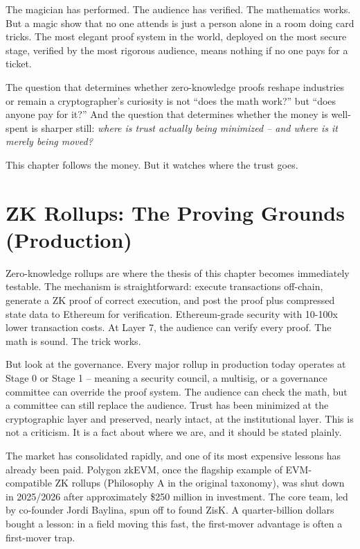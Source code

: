 \documentclass[
  11pt,
  openany]{report}
\begin{document}
The magician has performed. The audience has verified. The mathematics works.
But a magic show that no one attends is just a person alone in a room doing card
tricks. The most elegant proof system in the world, deployed on the most secure
stage, verified by the most rigorous audience, means nothing if no one pays for
a ticket.

The question that determines whether zero-knowledge proofs reshape industries or
remain a cryptographer's curiosity is not ``does the math work?'' but ``does
anyone pay for it?'' And the question that determines whether the money is
well-spent is sharper still: \emph{where is trust actually being minimized --
and where is it merely being moved?}

This chapter follows the money. But it watches where the trust goes.

\section{ZK Rollups: The Proving Grounds
(Production)}\label{zk-rollups-the-proving-grounds-production}

Zero-knowledge rollups are where the thesis of this chapter becomes immediately
testable. The mechanism is straightforward: execute transactions off-chain,
generate a ZK proof of correct execution, and post the proof plus compressed
state data to Ethereum for verification. Ethereum-grade security with 10-100x
lower transaction costs. At Layer 7, the audience can verify every proof. The
math is sound. The trick works.

But look at the governance. Every major rollup in production today operates at
Stage 0 or Stage 1 -- meaning a security council, a multisig, or a governance
committee can override the proof system. The audience can check the math, but a
committee can still replace the audience. Trust has been minimized at the
cryptographic layer and preserved, nearly intact, at the institutional layer.
This is not a criticism. It is a fact about where we are, and it should be
stated plainly.

The market has consolidated rapidly, and one of its most expensive lessons has
already been paid. Polygon zkEVM, once the flagship example of EVM-compatible ZK
rollups (Philosophy A in the original taxonomy), was shut down in 2025/2026
after approximately \$250 million in investment. The core team, led by
co-founder Jordi Baylina, spun off to found ZisK. A quarter-billion dollars
bought a lesson: in a field moving this fast, the first-mover advantage is often
a first-mover trap.
\end{document}
